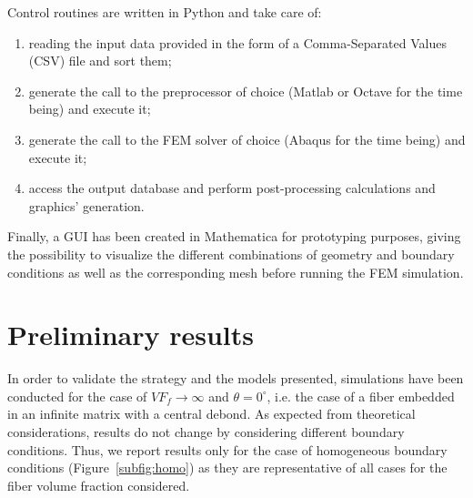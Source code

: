 \documentclass[a4paper]{jpconf}
\begin{document}
Control routines are written in Python and take care of:
\begin{enumerate}
\item reading the input data provided in the form of a Comma-Separated Values (CSV) file and sort them;
\item generate the call to the preprocessor of choice (Matlab or Octave for the time being) and execute it;
\item generate the call to the FEM solver of choice (Abaqus for the time being) and execute it;
\item access the output database and perform post-processing calculations and graphics' generation.
\end{enumerate}
Finally, a GUI has been created in Mathematica for prototyping purposes, giving the possibility to visualize the different combinations of geometry and boundary conditions as well as the corresponding mesh before running the FEM simulation.

\section{Preliminary results}

In order to validate the strategy and the models presented, simulations have been conducted for the case of $VF_{f}\to\infty$ and $\theta=0^{\circ}$, i.e. the case of a fiber embedded in an infinite matrix with a central debond. As expected from theoretical considerations, results do not change by considering different boundary conditions. Thus, we report results only for the case of homogeneous boundary conditions (Figure~\ref{subfig:homo}) as they are representative of all cases for the fiber volume fraction considered.\par
\end{document}
